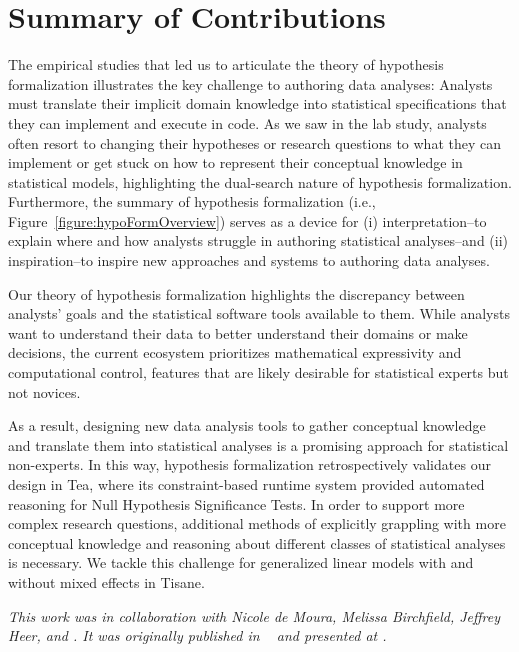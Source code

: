 

\section{Summary of Contributions}


The empirical studies that led us to articulate the theory of hypothesis
formalization illustrates the key challenge to authoring data analyses: Analysts
must translate their implicit domain knowledge into statistical specifications
that they can implement and execute in code. As we saw in the lab study,
analysts often resort to changing their hypotheses or research questions to what
they can implement or get stuck on how to represent their conceptual knowledge
in statistical models, highlighting the dual-search nature of hypothesis
formalization. Furthermore, the summary of hypothesis formalization (i.e.,
Figure~\ref{figure:hypoFormOverview}) serves as a device for (i) interpretation--to
explain where and how analysts struggle in authoring statistical analyses--and
(ii) inspiration--to inspire new approaches and systems to authoring data
analyses. 

Our theory of hypothesis formalization highlights the discrepancy between
analysts' goals and the statistical software tools available to them. While
analysts want to understand their data to better understand their domains or
make decisions, the current ecosystem prioritizes mathematical expressivity and
computational control, features that are likely desirable for statistical
experts but not novices. 

As a result, designing new data analysis tools to gather conceptual knowledge
and translate them into statistical analyses is a promising approach for
statistical non-experts. In this way, hypothesis formalization retrospectively
validates our design in Tea, where its constraint-based runtime system provided
automated reasoning for Null Hypothesis Significance Tests. In order to support
more complex research questions, additional methods of explicitly grappling with
more conceptual knowledge and reasoning about different classes of statistical
analyses is necessary. We tackle this challenge for generalized linear models
with and without mixed effects in Tisane. 

\textit{This work was in collaboration with Nicole de Moura, Melissa Birchfield, Jeffrey
Heer, and \reneJust. It was originally published in ~\cite{jun2022hypoForm} and presented
at .}